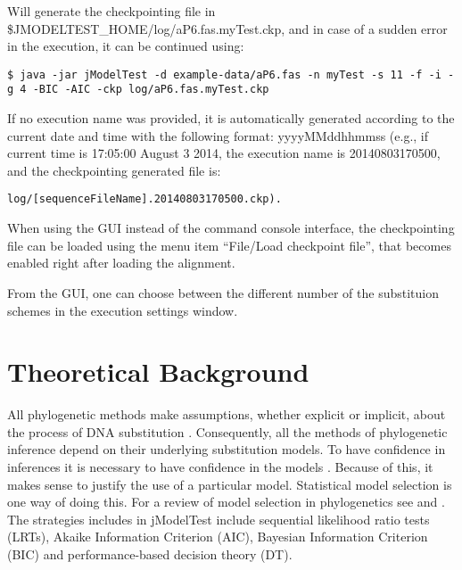\documentclass[11pt,twoside,a4paper]{article}
\begin{document}
Will generate the checkpointing file in \$JMODELTEST\_HOME/log/aP6.fas.myTest.ckp, and in case of a sudden error in the execution, it can be continued using:

\begin{lstlisting}
$ java -jar jModelTest -d example-data/aP6.fas -n myTest -s 11 -f -i -g 4 -BIC -AIC -ckp log/aP6.fas.myTest.ckp
\end{lstlisting}

If no execution name was provided, it is automatically generated according to the current date and time with the following format: yyyyMMddhhmmss (e.g., if current time is 17:05:00 August 3 2014, the execution name is 20140803170500, and the checkpointing generated file is:

\begin{lstlisting}
log/[sequenceFileName].20140803170500.ckp).
\end{lstlisting}

When using the GUI instead of the command console interface, the checkpointing file can be loaded using the menu item ``File/Load checkpoint file'', that becomes enabled right after loading the alignment.



From the GUI, one can choose between the different number of the substituion schemes in the execution settings window.


\section{Theoretical Background}

All phylogenetic methods make assumptions, whether explicit or implicit, about the process of DNA substitution \citep{Felsenstein-1988}. Consequently, all the methods of phylogenetic inference depend on their underlying substitution models. To have confidence in inferences it is necessary to have confidence in the models \citep{Goldman-1993b}. Because of this, it makes sense to justify the use of a particular model. Statistical model selection is one way of doing this. For a review of model selection in phylogenetics see \citet{Sullivan-2005} and \citet{Johnson-2003}. The strategies includes in jModelTest include sequential likelihood ratio tests (LRTs), Akaike Information Criterion (AIC), Bayesian Information Criterion (BIC) and performance-based decision theory (DT).
\end{document}
